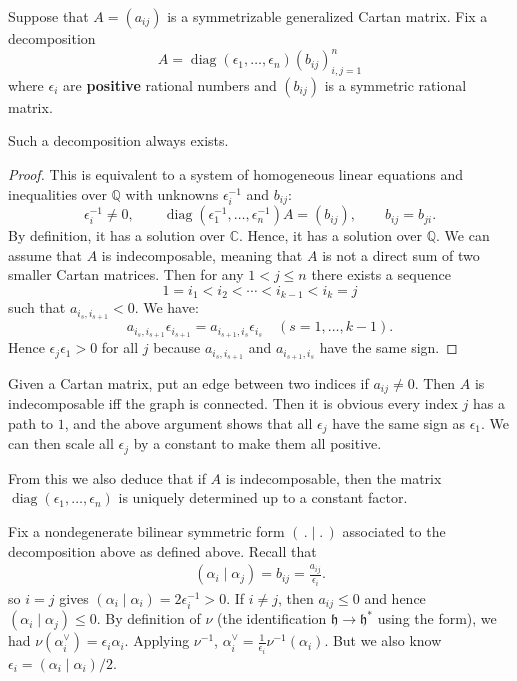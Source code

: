 \documentclass[12pt]{article}
\begin{document}
Suppose that $A = (a_{ij})$ is a symmetrizable generalized Cartan
matrix. Fix a decomposition
\[
    A = \operatorname{diag}(\epsilon_1,\dots,\epsilon_n)(b_{ij})_{i,j=1}^n
\]
where $\epsilon_i$ are \textbf{positive} rational numbers and $(b_{ij})$ is a
symmetric rational matrix.

\begin{lemma}
    Such a decomposition always exists.
\end{lemma}
\begin{proof}
    This is equivalent to a system of homogeneous linear equations
    and inequalities over $\mathbb{Q}$ with unknowns $\epsilon_i^{-1}$ and $b_{ij}$:
    \[
        \epsilon_i^{-1}\neq 0, \qquad
        \operatorname{diag}(\epsilon_1^{-1},\dots,\epsilon_n^{-1})A = (b_{ij}),
        \qquad b_{ij}=b_{ji}.
    \]
    By definition, it has a solution over $\mathbb{C}$. Hence, it has a
    solution over $\mathbb{Q}$. We can assume that $A$ is indecomposable, meaning that $A$ is not a direct sum of two smaller Cartan matrices. Then for any $1<j\leq n$ there exists a sequence
    \[
        1=i_1<i_2<\cdots<i_{k-1}<i_k=j
    \]
    such that $a_{i_s,i_{s+1}}<0$. We have:
    \[
        a_{i_s,i_{s+1}}\epsilon_{i_{s+1}}
        = a_{i_{s+1},i_s}\epsilon_{i_s}\quad (s=1,\dots,k-1).
    \]
    Hence $\epsilon_j\epsilon_1>0$ for all $j$ because $a_{i_s,i_{s+1}}$ and $a_{i_{s+1},i_s}$ have the same sign.
\end{proof}

\begin{remark}
     Given a Cartan matrix, put an edge between two indices if $a_{ij}\neq 0$. Then $A$ is indecomposable iff the graph is connected. Then it is obvious every index $j$ has a path to $1$, and the above argument shows that all $\epsilon_j$ have the same sign as $\epsilon_1$. We can then scale all $\epsilon_j$ by a constant to make them all positive.
\end{remark}
From this we also deduce that if $A$ is indecomposable, then the matrix $\operatorname{diag}(\epsilon_1,\dots,\epsilon_n)$ is uniquely determined up to a constant factor.

Fix a nondegenerate bilinear symmetric form $(\,.\mid.\,)$ associated to
the decomposition above as defined above. Recall that \begin{align*}
    (\alpha_i\mid \alpha_j) = b_{ij} = \frac{a_{ij}}{\epsilon_i}.
\end{align*}
so $i=j$ gives $(\alpha_i\mid \alpha_i) = 2\epsilon_i^{-1} > 0$. If $i\neq j$, then $a_{ij}\leq 0$ and hence $(\alpha_i\mid \alpha_j)\leq 0$. By definition of $\nu$ (the identification $\mathfrak{h}\to\mathfrak{h}^*$ using the form), we had
$\nu(\alpha_i^\vee)=\epsilon_i\alpha_i$.
Applying $\nu^{-1}$,
$\alpha_i^\vee = \frac{1}{\epsilon_i}\nu^{-1}(\alpha_i)$.
But we also know
$\epsilon_i=(\alpha_i\mid \alpha_i)/2$.
\end{document}

